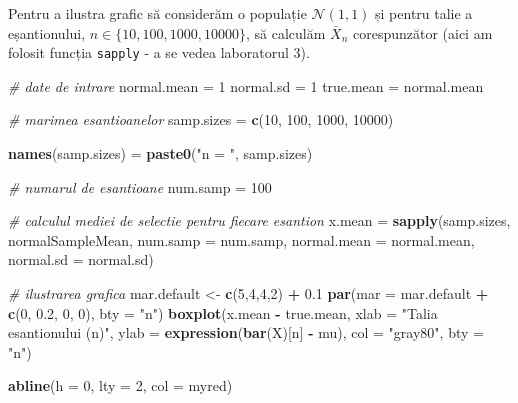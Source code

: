 \documentclass[]{article}
\newenvironment{Shaded}{\begin{snugshade}}{\end{snugshade}}
\newcommand{\KeywordTok}[1]{\textcolor[rgb]{0.13,0.29,0.53}{\textbf{#1}}}
\newcommand{\DataTypeTok}[1]{\textcolor[rgb]{0.13,0.29,0.53}{#1}}
\newcommand{\DecValTok}[1]{\textcolor[rgb]{0.00,0.00,0.81}{#1}}
\newcommand{\FloatTok}[1]{\textcolor[rgb]{0.00,0.00,0.81}{#1}}
\newcommand{\StringTok}[1]{\textcolor[rgb]{0.31,0.60,0.02}{#1}}
\newcommand{\CommentTok}[1]{\textcolor[rgb]{0.56,0.35,0.01}{\textit{#1}}}
\newcommand{\OperatorTok}[1]{\textcolor[rgb]{0.81,0.36,0.00}{\textbf{#1}}}
\newcommand{\NormalTok}[1]{#1}
\begin{document}
Pentru a ilustra grafic să considerăm o populație \(\mathcal{N}(1,1)\)
și pentru talie a eșantionului, \(n\in\{10, 100, 1000, 10000\}\), să
calculăm \(\bar{X}_n\) corespunzător (aici am folosit funcția
\texttt{sapply} - a se vedea laboratorul 3).

\begin{Shaded}
\begin{Highlighting}[]
\CommentTok{# date de intrare}
\NormalTok{normal.mean =}\StringTok{ }\DecValTok{1}
\NormalTok{normal.sd =}\StringTok{ }\DecValTok{1}
\NormalTok{true.mean =}\StringTok{ }\NormalTok{normal.mean}

\CommentTok{# marimea esantioanelor}
\NormalTok{samp.sizes =}\StringTok{ }\KeywordTok{c}\NormalTok{(}\DecValTok{10}\NormalTok{, }\DecValTok{100}\NormalTok{, }\DecValTok{1000}\NormalTok{, }\DecValTok{10000}\NormalTok{)}

\KeywordTok{names}\NormalTok{(samp.sizes) =}\StringTok{ }\KeywordTok{paste0}\NormalTok{(}\StringTok{"n = "}\NormalTok{, samp.sizes)}

\CommentTok{# numarul de esantioane}
\NormalTok{num.samp =}\StringTok{ }\DecValTok{100}

\CommentTok{# calculul mediei de selectie pentru fiecare esantion}
\NormalTok{x.mean =}\StringTok{ }\KeywordTok{sapply}\NormalTok{(samp.sizes, normalSampleMean, }\DataTypeTok{num.samp =}\NormalTok{ num.samp, }
                \DataTypeTok{normal.mean =}\NormalTok{ normal.mean, }\DataTypeTok{normal.sd =}\NormalTok{ normal.sd)}

\CommentTok{# ilustrarea grafica}
\NormalTok{mar.default <-}\StringTok{ }\KeywordTok{c}\NormalTok{(}\DecValTok{5}\NormalTok{,}\DecValTok{4}\NormalTok{,}\DecValTok{4}\NormalTok{,}\DecValTok{2}\NormalTok{) }\OperatorTok{+}\StringTok{ }\FloatTok{0.1}
\KeywordTok{par}\NormalTok{(}\DataTypeTok{mar =}\NormalTok{ mar.default }\OperatorTok{+}\StringTok{ }\KeywordTok{c}\NormalTok{(}\DecValTok{0}\NormalTok{, }\FloatTok{0.2}\NormalTok{, }\DecValTok{0}\NormalTok{, }\DecValTok{0}\NormalTok{), }\DataTypeTok{bty =} \StringTok{"n"}\NormalTok{) }
\KeywordTok{boxplot}\NormalTok{(x.mean }\OperatorTok{-}\StringTok{ }\NormalTok{true.mean, }
        \DataTypeTok{xlab =} \StringTok{"Talia esantionului (n)"}\NormalTok{, }
        \DataTypeTok{ylab =} \KeywordTok{expression}\NormalTok{(}\KeywordTok{bar}\NormalTok{(X)[n] }\OperatorTok{-}\StringTok{ }\NormalTok{mu),}
        \DataTypeTok{col =} \StringTok{"gray80"}\NormalTok{,}
        \DataTypeTok{bty =} \StringTok{"n"}\NormalTok{)}

\KeywordTok{abline}\NormalTok{(}\DataTypeTok{h =} \DecValTok{0}\NormalTok{, }\DataTypeTok{lty =} \DecValTok{2}\NormalTok{, }\DataTypeTok{col =}\NormalTok{ myred)}
\end{Highlighting}
\end{Shaded}
\end{document}
